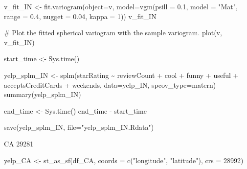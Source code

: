 \documentclass[
  12pt,
  letterpaper,
  DIV=11,
  numbers=noendperiod]{scrartcl}
\newenvironment{Shaded}{\begin{snugshade}}{\end{snugshade}}
\newcommand{\AttributeTok}[1]{\textcolor[rgb]{0.98,0.46,0.51}{#1}}
\newcommand{\CommentTok}[1]{\textcolor[rgb]{0.42,0.45,0.49}{#1}}
\newcommand{\DecValTok}[1]{\textcolor[rgb]{0.47,0.72,1.00}{#1}}
\newcommand{\FloatTok}[1]{\textcolor[rgb]{0.47,0.72,1.00}{#1}}
\newcommand{\FunctionTok}[1]{\textcolor[rgb]{0.70,0.57,0.94}{#1}}
\newcommand{\NormalTok}[1]{\textcolor[rgb]{0.88,0.89,0.91}{#1}}
\newcommand{\OtherTok}[1]{\textcolor[rgb]{0.70,0.57,0.94}{#1}}
\newcommand{\SpecialCharTok}[1]{\textcolor[rgb]{0.47,0.72,1.00}{#1}}
\newcommand{\StringTok}[1]{\textcolor[rgb]{0.62,0.80,1.00}{#1}}
\begin{document}
\begin{Shaded}
\begin{Highlighting}[]
\NormalTok{v\_fit\_IN }\OtherTok{\textless{}{-}} \FunctionTok{fit.variogram}\NormalTok{(}\AttributeTok{object=}\NormalTok{v, }
                           \AttributeTok{model=}\FunctionTok{vgm}\NormalTok{(}\AttributeTok{psill =} \FloatTok{0.1}\NormalTok{, }\AttributeTok{model =} \StringTok{"Mat"}\NormalTok{, }
                                     \AttributeTok{range =} \FloatTok{0.4}\NormalTok{, }\AttributeTok{nugget =} \FloatTok{0.04}\NormalTok{, }\AttributeTok{kappa =} \DecValTok{1}\NormalTok{))}
\NormalTok{v\_fit\_IN}

\CommentTok{\# Plot the fitted spherical variogram with the sample variogram.}
\FunctionTok{plot}\NormalTok{(v, v\_fit\_IN)}
\end{Highlighting}
\end{Shaded}

\begin{Shaded}
\begin{Highlighting}[]
\NormalTok{start\_time }\OtherTok{\textless{}{-}} \FunctionTok{Sys.time}\NormalTok{()}


\NormalTok{yelp\_splm\_IN }\OtherTok{\textless{}{-}} \FunctionTok{splm}\NormalTok{(starRating }\SpecialCharTok{\textasciitilde{}}\NormalTok{ reviewCount }\SpecialCharTok{+}\NormalTok{ cool }\SpecialCharTok{+}\NormalTok{ funny }\SpecialCharTok{+}\NormalTok{ useful }\SpecialCharTok{+}\NormalTok{ acceptsCreditCards }\SpecialCharTok{+}\NormalTok{ weekends, }\AttributeTok{data=}\NormalTok{yelp\_IN, }\AttributeTok{spcov\_type=}\StringTok{\textquotesingle{}matern\textquotesingle{}}\NormalTok{)}
\FunctionTok{summary}\NormalTok{(yelp\_splm\_IN)}

\NormalTok{end\_time }\OtherTok{\textless{}{-}} \FunctionTok{Sys.time}\NormalTok{()}
\NormalTok{end\_time }\SpecialCharTok{{-}}\NormalTok{ start\_time}
\end{Highlighting}
\end{Shaded}

\begin{Shaded}
\begin{Highlighting}[]
\FunctionTok{save}\NormalTok{(yelp\_splm\_IN, }\AttributeTok{file=}\StringTok{"yelp\_splm\_IN.Rdata"}\NormalTok{)}
\end{Highlighting}
\end{Shaded}

CA 29281

\begin{Shaded}
\begin{Highlighting}[]
\NormalTok{yelp\_CA }\OtherTok{\textless{}{-}} \FunctionTok{st\_as\_sf}\NormalTok{(df\_CA, }\AttributeTok{coords =} \FunctionTok{c}\NormalTok{(}\StringTok{"longitude"}\NormalTok{, }\StringTok{"latitude"}\NormalTok{), }\AttributeTok{crs =} \DecValTok{28992}\NormalTok{)}
\end{Highlighting}
\end{Shaded}
\end{document}
